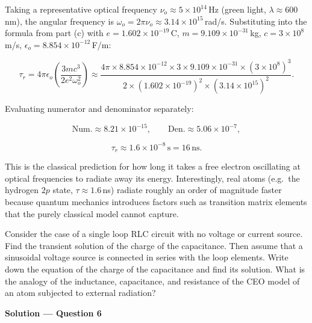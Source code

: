 Taking a representative optical frequency $\nu_o \approx 5\times10^{14}$\,Hz (green light, $\lambda \approx 600$\,nm), the angular frequency is $\omega_o = 2\pi\nu_o \approx 3.14\times10^{15}$\,rad/s. Substituting into the formula from part (c) with $e = 1.602\times10^{-19}$\,C, $m = 9.109\times10^{-31}$\,kg, $c = 3\times10^8$\,m/s, $\epsilon_o = 8.854\times10^{-12}$\,F/m:

\begin{equation*}
  \tau_r = 4\pi\epsilon_o\!\left(\frac{3mc^3}{2e^2\omega_o^2}\right)
  \approx \frac{4\pi\times8.854\times10^{-12}\times 3\times9.109\times10^{-31}\times(3\times10^8)^3}{2\times(1.602\times10^{-19})^2\times(3.14\times10^{15})^2}.
\end{equation*}

Evaluating numerator and denominator separately:

\begin{equation*}
  \text{Num.} \approx 8.21\times10^{-15}, \qquad
  \text{Den.} \approx 5.06\times10^{-7},
\end{equation*}

\begin{equation*}
  \boxed{\tau_r \approx 1.6\times10^{-8}\,\text{s} = 16\,\text{ns}.}
\end{equation*}

This is the classical prediction for how long it takes a free electron oscillating at optical frequencies to radiate away its energy. Interestingly, real atoms (e.g.\ the hydrogen $2p$ state, $\tau \approx 1.6$\,ns) radiate roughly an order of magnitude faster because quantum mechanics introduces factors such as transition matrix elements that the purely classical model cannot capture.


\begin{question}[Question 6]Consider the case of a single loop RLC circuit with no voltage or current
source. Find the transient solution of the charge of the capacitance. Then assume that a
sinusoidal voltage source is connected in series with the loop elements. Write down the equation
of the charge of the capacitance and find its solution. What is the analogy of the inductance,
capacitance, and resistance of the CEO model of an atom subjected to external radiation?
\end{question}

\textbf{\large Solution --- Question 6}

